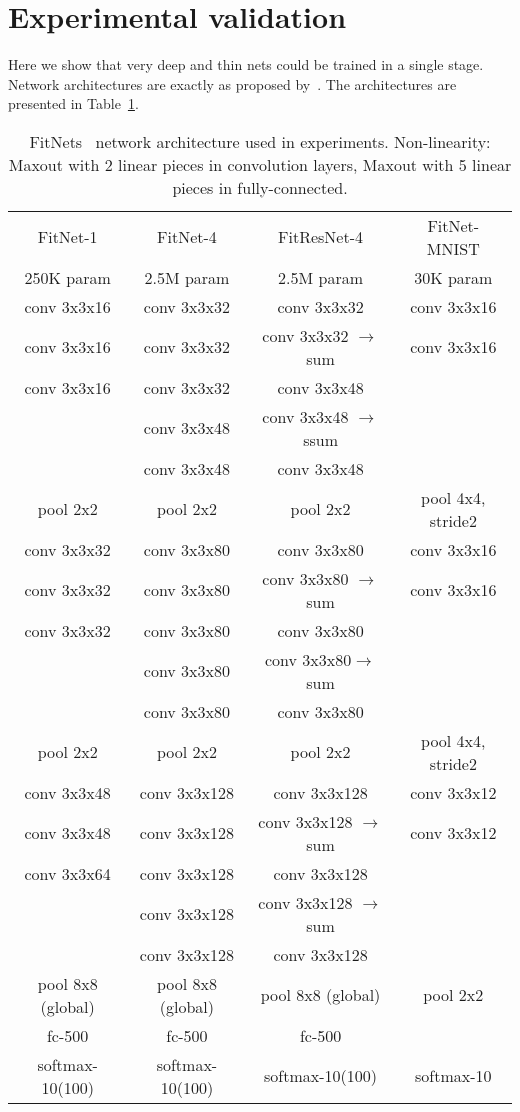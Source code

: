 \documentclass{article} \clearpage{}\usepackage{iclr2016_conference,times}
\begin{document}
\section{Experimental validation}
\label{sec:experiment}
Here we show that very deep and thin nets could be trained in a single stage. Network architectures are exactly as proposed by~\cite{FitNets2014}. The architectures are presented in Table~\ref{tab:fitnet-architectures}.
\begin{table}[htb]
\caption{ FitNets~\cite{FitNets2014} network architecture used in experiments. Non-linearity: Maxout with 2 linear pieces in convolution layers, Maxout with 5 linear pieces in fully-connected.}
\label{tab:fitnet-architectures}
\centering
\setlength{\tabcolsep}{.3em}
\begin{tabular}{|c|c|c|c|}
\hline
FitNet-1 & FitNet-4 & FitResNet-4& FitNet-MNIST\\
250K param & 2.5M param &  2.5M param & 30K param\\
\hline
conv 3x3x16 & conv 3x3x32 & conv 3x3x32 & conv 3x3x16 \\
conv 3x3x16 & conv 3x3x32 & conv 3x3x32 $\rightarrow$sum & conv 3x3x16 \\
conv 3x3x16 & conv 3x3x32 & conv 3x3x48 & \\
&  conv 3x3x48&  conv 3x3x48 $\rightarrow$ssum &  \\
&  conv 3x3x48&  conv 3x3x48 &  \\
pool 2x2&  pool 2x2 & pool 2x2 & pool 4x4, stride2 \\
\hline
conv 3x3x32 & conv 3x3x80 & conv 3x3x80 & conv 3x3x16 \\
conv 3x3x32 & conv 3x3x80 & conv 3x3x80 $\rightarrow$sum  & conv 3x3x16 \\
conv 3x3x32 & conv 3x3x80& conv 3x3x80 &  \\
&  conv 3x3x80& conv 3x3x80$\rightarrow$sum &  \\
&  conv 3x3x80& conv 3x3x80  &  \\
pool 2x2&  pool 2x2 & pool 2x2 & pool 4x4, stride2 \\
\hline
conv 3x3x48 & conv 3x3x128 & conv 3x3x128 & conv 3x3x12 \\
conv 3x3x48 & conv 3x3x128 & conv 3x3x128 $\rightarrow$sum& conv 3x3x12 \\
conv 3x3x64 & conv 3x3x128& conv 3x3x128  & \\
&  conv 3x3x128& conv 3x3x128 $\rightarrow$sum &  \\
&  conv 3x3x128 & conv 3x3x128 & \\
pool 8x8 (global)&  pool 8x8 (global) &pool 8x8 (global) & pool 2x2 \\
\hline
fc-500&  fc-500 &fc-500&   \\
softmax-10(100) & softmax-10(100) & softmax-10(100) & softmax-10\\
\hline
\end{tabular}
\end{table}
\end{document}
